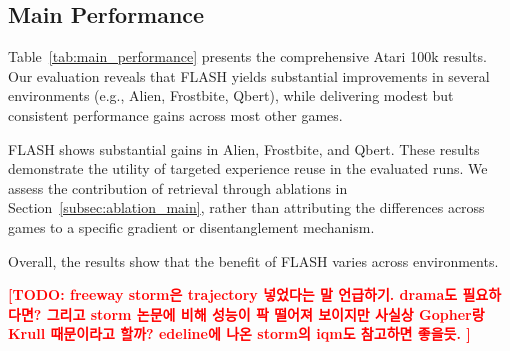 \documentclass{article} %
\newcommand{\todo}[1]{\textcolor{red}{\textbf{[TODO: #1]}}}
\begin{document}
\subsection{Main Performance}
Table~\ref{tab:main_performance} presents the comprehensive Atari 100k results. 
Our evaluation reveals that FLASH yields substantial improvements in several environments (e.g., Alien, Frostbite, Qbert), while delivering modest but consistent performance gains across most other games.

FLASH shows substantial gains in Alien, Frostbite, and Qbert. These results demonstrate the utility of targeted experience reuse in the evaluated runs. We assess the contribution of retrieval through ablations in Section~\ref{subsec:ablation_main}, rather than attributing the differences across games to a specific gradient or disentanglement mechanism.

Overall, the results show that the benefit of FLASH varies across environments.

\todo{freeway storm은 trajectory 넣었다는 말 언급하기. drama도 필요하다면? 그리고 storm 논문에 비해 성능이 팍 떨어져 보이지만 사실상 Gopher랑 Krull 때문이라고 할까? edeline에 나온 storm의 iqm도 참고하면 좋을듯. }
\end{document}
